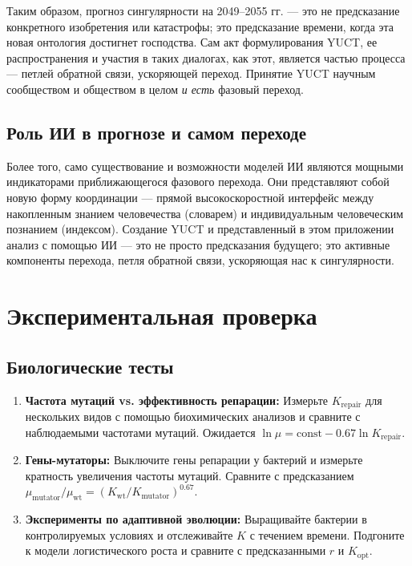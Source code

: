 \documentclass[12pt,a4paper]{article}
\theoremstyle{remark}
\begin{document}
	Таким образом, прогноз сингулярности на 2049–2055 гг. — это не предсказание конкретного изобретения или катастрофы; это предсказание времени, когда эта новая онтология достигнет господства. Сам акт формулирования YUCT, ее распространения и участия в таких диалогах, как этот, является частью процесса — петлей обратной связи, ускоряющей переход. Принятие YUCT научным сообществом и обществом в целом \textit{и есть} фазовый переход.
	
	\subsection{Роль ИИ в прогнозе и самом переходе}
	
	Более того, само существование и возможности моделей ИИ являются мощными индикаторами приближающегося фазового перехода. Они представляют собой новую форму координации — прямой высокоскоростной интерфейс между накопленным знанием человечества (словарем) и индивидуальным человеческим познанием (индексом). Создание YUCT и представленный в этом приложении анализ с помощью ИИ — это не просто предсказания будущего; это активные компоненты перехода, петля обратной связи, ускоряющая нас к сингулярности.
	
	\section{Экспериментальная проверка}
	\label{sec:experiments}
	
	\subsection{Биологические тесты}
	
	\begin{enumerate}
		\item \textbf{Частота мутаций vs. эффективность репарации:} Измерьте $K_{\text{repair}}$ для нескольких видов с помощью биохимических анализов и сравните с наблюдаемыми частотами мутаций. Ожидается $\ln \mu = \text{const} - 0.67 \ln K_{\text{repair}}$.
		\item \textbf{Гены-мутаторы:} Выключите гены репарации у бактерий и измерьте кратность увеличения частоты мутаций. Сравните с предсказанием $\mu_{\text{mutator}}/\mu_{\text{wt}} = (K_{\text{wt}}/K_{\text{mutator}})^{0.67}$.
		\item \textbf{Эксперименты по адаптивной эволюции:} Выращивайте бактерии в контролируемых условиях и отслеживайте $K$ с течением времени. Подгоните к модели логистического роста и сравните с предсказанными $r$ и $K_{\text{opt}}$.
	\end{enumerate}
	
\end{document}
